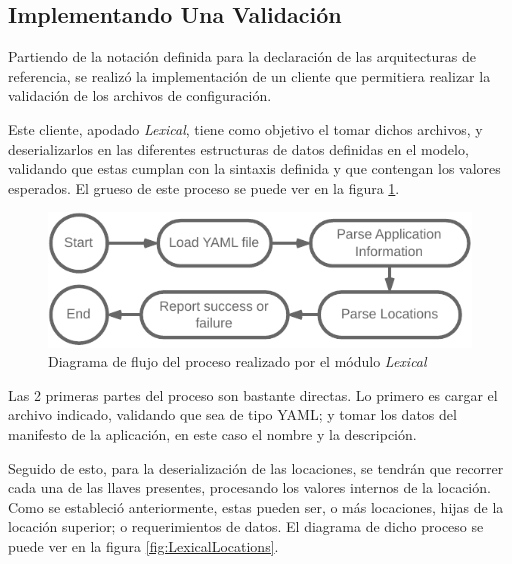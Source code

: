 \subsection{Implementando Una Validación} \label{sec:validation}


Partiendo de la notación definida para la declaración de las arquitecturas de referencia, se realizó la implementación de un cliente que permitiera realizar la validación de los archivos de configuración.

Este cliente, apodado \textit{Lexical}, tiene como objetivo el tomar dichos archivos, y deserializarlos en las diferentes estructuras de datos definidas en el modelo, validando que estas cumplan con la sintaxis definida y que contengan los valores esperados. El grueso de este proceso se puede ver en la figura \ref*{fig:LexicalFlow}.

\begin{figure}[ht]
    \centering
    \caption{Diagrama de flujo del proceso realizado por el módulo \textit{Lexical}}
    \label{fig:LexicalFlow}
    \vspace{2mm}
    \includegraphics[width=0.75\linewidth]{images/LexicalFlow.pdf}
\end{figure}

Las 2 primeras partes del proceso son bastante directas. Lo primero es cargar el archivo indicado, validando que sea de tipo YAML; y tomar los datos del manifesto de la aplicación, en este caso el nombre y la descripción.

Seguido de esto, para la deserialización de las locaciones, se tendrán que recorrer cada una de las llaves presentes, procesando los valores internos de la locación. Como se estableció anteriormente, estas pueden ser, o más locaciones, hijas de la locación superior; o requerimientos de datos. El diagrama de dicho proceso se puede ver en la figura \ref{fig:LexicalLocations}.

